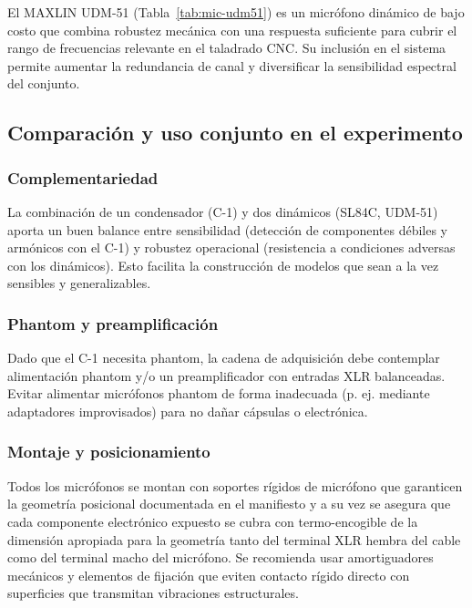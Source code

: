\documentclass[12pt, letterpaper]{report}
\begin{document}
El MAXLIN UDM-51 (Tabla~\ref{tab:mic-udm51}) es un micrófono dinámico de bajo costo que combina robustez mecánica con una respuesta suficiente para cubrir el rango de frecuencias relevante en el taladrado CNC. Su inclusión en el sistema permite aumentar la redundancia de canal y diversificar la sensibilidad espectral del conjunto.

\subsection{Comparación y uso conjunto en el experimento}

\subsubsection{Complementariedad}

La combinación de un condensador (C-1) y dos dinámicos (SL84C, UDM-51) aporta un buen balance entre sensibilidad (detección de componentes débiles y armónicos con el C-1) y robustez operacional (resistencia a condiciones adversas con los dinámicos). Esto facilita la construcción de modelos que sean a la vez sensibles y generalizables.

\subsubsection{Phantom y preamplificación}

Dado que el C-1 necesita phantom, la cadena de adquisición debe contemplar alimentación phantom y/o un preamplificador con entradas XLR balanceadas. Evitar alimentar micrófonos phantom de forma inadecuada (p. ej. mediante adaptadores improvisados) para no dañar cápsulas o electrónica.

\subsubsection{Montaje y posicionamiento}

 Todos los micrófonos se montan con soportes rígidos de micrófono que garanticen la geometría posicional documentada en el manifiesto y a su vez se asegura que cada componente electrónico expuesto se cubra con termo-encogible de la dimensión apropiada para la geometría tanto del terminal XLR hembra del cable como del terminal macho del micrófono. Se recomienda usar amortiguadores mecánicos y elementos de fijación que eviten contacto rígido directo con superficies que transmitan vibraciones estructurales.
\end{document}
